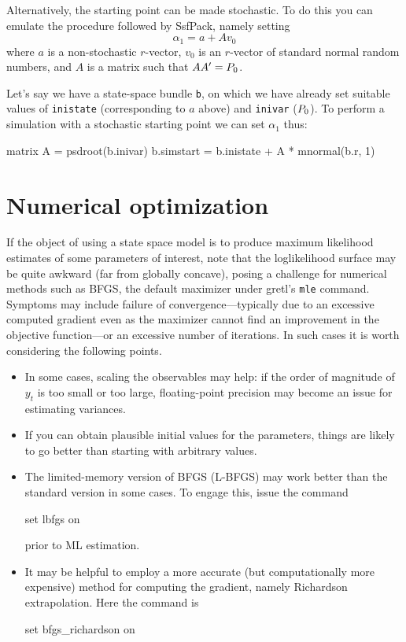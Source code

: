Alternatively, the starting point can be made stochastic. To do this
you can emulate the procedure followed by \textsf{SsfPack}, namely
setting
\[
\alpha_1 = a + A v_0
\]
where $a$ is a non-stochastic $r$-vector, $v_0$ is an $r$-vector
of standard normal random numbers, and $A$ is a matrix such
that $AA' = P_0$.

Let's say we have a state-space bundle \texttt{b}, on which we have
already set suitable values of \texttt{inistate} (corresponding to $a$
above) and \texttt{inivar} ($P_0$).  To perform a simulation
with a stochastic starting point we can set $\alpha_1$ thus:
%
\begin{code}
matrix A = psdroot(b.inivar)
b.simstart = b.inistate + A * mnormal(b.r, 1)
\end{code}

\section{Numerical optimization}
\label{sec:ssopt}

If the object of using a state space model is to produce maximum
likelihood estimates of some parameters of interest, note that the
loglikelihood surface may be quite awkward (far from globally
concave), posing a challenge for numerical methods such as BFGS, the
default maximizer under gretl's \texttt{mle} command. Symptoms may
include failure of convergence---typically due to an excessive
computed gradient even as the maximizer cannot find an improvement in
the objective function---or an excessive number of iterations. In such
cases it is worth considering the following points.
\begin{itemize}
\item In some cases, scaling the observables may help: if the order of
  magnitude of $y_t$ is too small or too large, floating-point
  precision may become an issue for estimating variances.
\item If you can obtain plausible initial values for the parameters,
  things are likely to go better than starting with arbitrary values.
\item The limited-memory version of BFGS (L-BFGS) may work better than
  the standard version in some cases. To engage this, issue the
  command
\begin{code}
set lbfgs on
\end{code}
  prior to ML estimation.
\item It may be helpful to employ a more accurate (but computationally
  more expensive) method for computing the gradient, namely Richardson
  extrapolation. Here the command is
\begin{code}
set bfgs_richardson on
\end{code}
\end{itemize}

